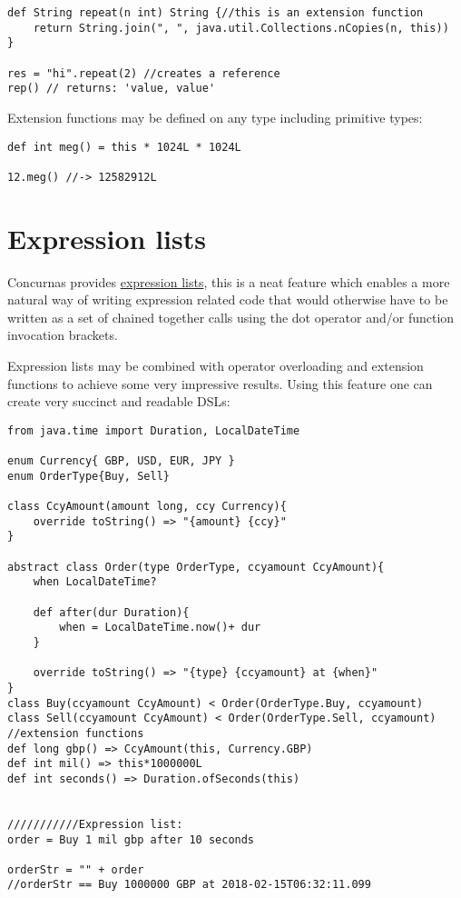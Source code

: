 \documentclass[conc-doc]{subfiles}
\begin{document}
\begin{lstlisting}
def String repeat(n int) String {//this is an extension function
	return String.join(", ", java.util.Collections.nCopies(n, this))
}

res = "hi".repeat(2) //creates a reference
rep() // returns: 'value, value'
\end{lstlisting}

Extension functions may be defined on any type including primitive types:
\begin{lstlisting}
def int meg() = this * 1024L * 1024L

12.meg() //-> 12582912L
\end{lstlisting}

\section{Expression lists}
Concurnas provides \hyperref[ch:exprLists]{expression lists}, this is a neat feature which enables a more natural way of writing expression related code that would otherwise have to be written as a set of chained together calls using the dot operator and/or function invocation brackets.

Expression lists may be combined with operator overloading and extension functions to achieve some very impressive results. Using this feature one can create very succinct and readable DSLs:

\begin{lstlisting}
from java.time import Duration, LocalDateTime

enum Currency{ GBP, USD, EUR, JPY }
enum OrderType{Buy, Sell}

class CcyAmount(amount long, ccy Currency){
	override toString() => "{amount} {ccy}"
}

abstract class Order(type OrderType, ccyamount CcyAmount){
	when LocalDateTime?
	
	def after(dur Duration){
		when = LocalDateTime.now()+ dur
	}
	
	override toString() => "{type} {ccyamount} at {when}"
}
class Buy(ccyamount CcyAmount) < Order(OrderType.Buy, ccyamount)
class Sell(ccyamount CcyAmount) < Order(OrderType.Sell, ccyamount)
//extension functions
def long gbp() => CcyAmount(this, Currency.GBP)
def int mil() => this*1000000L
def int seconds() => Duration.ofSeconds(this)


///////////Expression list:
order = Buy 1 mil gbp after 10 seconds

orderStr = "" + order
//orderStr == Buy 1000000 GBP at 2018-02-15T06:32:11.099
\end{lstlisting}
\end{document}
